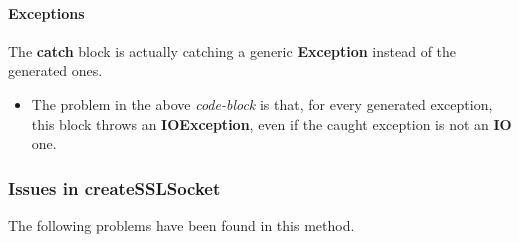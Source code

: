 \paragraph{Exceptions}
\begin{itemize}
		\begin{itemize}
				The \textbf{catch} block
				is actually catching a generic \textbf{Exception} instead of the generated ones.
		\end{itemize}
	\checklist{53}
		\begin{itemize}
			\item
				The problem in the above \textit{code-block} is that, for every generated exception, this block throws an \textbf{IOException}, even if the caught exception is not an \textbf{IO} one.
		\end{itemize}
\end{itemize}
%
%
%
\subsubsection{Issues in createSSLSocket}
The following problems have been found in this method.
%
